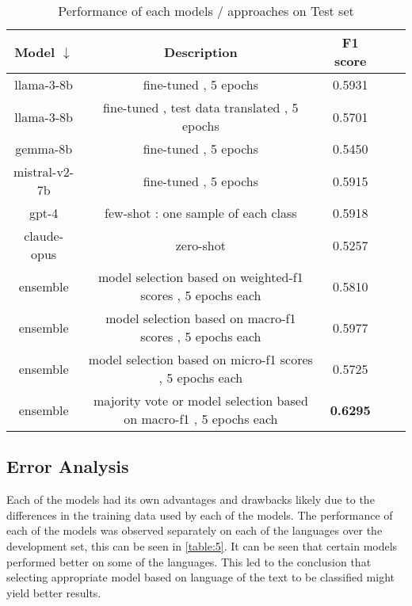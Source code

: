 \documentclass[11pt]{article}
\begin{document}
\begin{table*}[ht]
    \centering
    \begin{tabular}{|c|c|c|c|c|}
    \hline
    \textbf{Model $\downarrow$} & \textbf{Description} & \textbf{F1 score} \\
    \hline
    llama-3-8b       & fine-tuned , 5 epochs                               & 0.5931  \\
    llama-3-8b       & fine-tuned , test data translated , 5 epochs        & 0.5701  \\
    gemma-8b         & fine-tuned , 5 epochs                               & 0.5450  \\
    mistral-v2-7b    & fine-tuned , 5 epochs                               & 0.5915  \\
    gpt-4            & few-shot : one sample of each class                 & 0.5918  \\
    claude-opus      & zero-shot                                           & 0.5257  \\
    ensemble         & model selection based on weighted-f1 scores , 5 epochs each        & 0.5810  \\
    ensemble         & model selection based on macro-f1 scores , 5 epochs each           & 0.5977  \\
    ensemble         & model selection based on micro-f1 scores , 5 epochs each           & 0.5725  \\
    ensemble         & majority vote or model selection based on macro-f1 , 5 epochs each & \textbf{0.6295}  \\
    \hline     
    \end{tabular}
    \caption{Performance of each models / approaches on Test set}
    \label{table:4}
\end{table*}


\subsection{Error Analysis}
Each of the models had its own advantages and drawbacks likely due to the differences in the training data used by each of the models. The performance of each of the models was observed separately on each of the languages over the development set, this can be seen in \autoref{table:5}. It can be seen that certain models performed better on some of the languages. This led to the conclusion that selecting appropriate model based on language of the text to be classified might yield better results.
\end{document}
